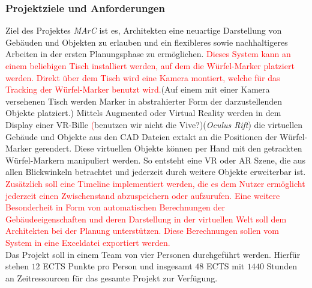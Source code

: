 \subsubsection{Projektziele und Anforderungen}
Ziel des Projektes \textit{MArC} ist es, Architekten eine neuartige Darstellung von Gebäuden und Objekten zu erlauben und ein flexibleres sowie nachhaltigeres Arbeiten in der ersten Planungsphase zu ermöglichen. \textcolor{red}{Dieses System kann an einem beliebigen Tisch installiert werden, auf dem die Würfel-Marker platziert werden. Direkt über dem Tisch wird eine Kamera montiert, welche für das Tracking der Würfel-Marker benutzt wird.}(Auf einem mit einer Kamera versehenen Tisch werden Marker in abstrahierter Form der darzustellenden Objekte platziert.) Mittels Augmented oder Virtual Reality werden in dem Display einer VR-Bille \textcolor{red}(benutzen wir nicht die Vive?)(\textit{Oculus Rift}) die virtuellen Gebäude und Objekte aus den CAD Dateien extakt an die Positionen der Würfel-Marker gerendert. Diese virtuellen Objekte können per Hand mit den getrackten Würfel-Markern manipuliert werden. So entsteht eine VR oder AR Szene, die aus allen Blickwinkeln betrachtet und jederzeit durch weitere Objekte erweiterbar ist. \\
\textcolor{red}{Zusätzlich soll eine Timeline implementiert werden, die es dem Nutzer ermöglicht jederzeit einen Zwischenstand abzuspeichern oder aufzurufen. Eine weitere Besonderheit in Form von automatischen Berechnungen der Gebäudeeigenschaften und deren Darstellung in der virtuellen Welt soll dem Architekten bei der Planung unterstützen. Diese Berechnungen sollen vom System in eine Exceldatei exportiert werden.}\\
Das Projekt soll in einem Team von vier Personen durchgeführt werden. Hierfür stehen $12$ ECTS Punkte pro Person und insgesamt $48$ ECTS mit $1440$ Stunden an Zeitressourcen für das gesamte Projekt zur Verfügung.


